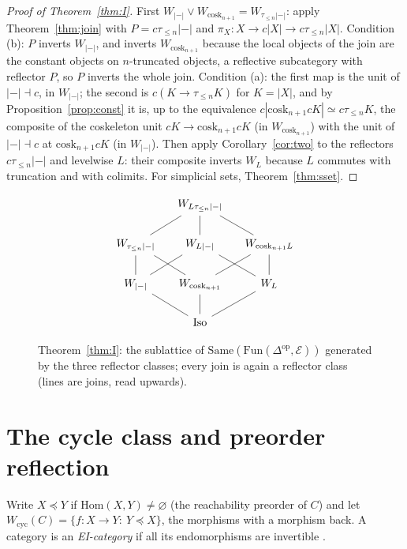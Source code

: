 \documentclass[11pt]{amsart}
\theoremstyle{definition}
\newcommand{\Same}{\mathrm{Same}}
\newcommand{\Iso}{\mathrm{Iso}}
\newcommand{\Hom}{\mathrm{Hom}}
\newcommand{\cosk}{\mathrm{cosk}}
\newcommand{\Fun}{\mathrm{Fun}}
\newcommand{\E}{\mathcal E}
\newcommand{\tr}[1]{\tau_{\le #1}}
\newcommand{\re}{|{-}|}
\newcommand{\Wcyc}{W_{\mathrm{cyc}}}
\begin{document}
\begin{proof}[Proof of Theorem~\ref{thm:I}]
First $W_{\re}\vee W_{\cosk_{n+1}}=W_{\tr n\re}$: apply Theorem~\ref{thm:join}
with $P=c\tr n\re$ and $\pi_X\colon X\to c|X|\to c\tr n|X|$. Condition (b):
$P$ inverts $W_{\re}$, and inverts $W_{\cosk_{n+1}}$ because the local objects
of the join are the constant objects on $n$-truncated objects, a reflective
subcategory with reflector $P$, so $P$ inverts the whole join. Condition (a):
the first map is the unit of $\re\dashv c$, in $W_{\re}$; the second is
$c(K\to\tr nK)$ for $K=|X|$, and by Proposition~\ref{prop:const} it is, up to
the equivalence $c|\cosk_{n+1}cK|\simeq c\tr nK$, the composite of the
coskeleton unit $cK\to\cosk_{n+1}cK$ (in $W_{\cosk_{n+1}}$) with the unit of
$\re\dashv c$ at $\cosk_{n+1}cK$ (in $W_{\re}$). Then apply
Corollary~\ref{cor:two} to the reflectors $c\tr n\re$ and levelwise $L$: their
composite inverts $W_L$ because $L$ commutes with truncation and with colimits.
For simplicial sets, Theorem~\ref{thm:sset}.
\end{proof}

\begin{figure}[ht]
\[
\begin{tikzcd}[row sep=normal, column sep=small]
& & W_{L\tr n\re} & & \\
& W_{\tr n\re}\arrow[ur,dash] & W_{L\re}\arrow[u,dash] & W_{\cosk_{n+1}L}\arrow[ul,dash] & \\
& W_{\re}\arrow[u,dash]\arrow[ur,dash] & W_{\cosk_{n+1}}\arrow[ul,dash]\arrow[ur,dash] & W_{L}\arrow[ul,dash]\arrow[u,dash] & \\
& & \Iso\arrow[ul,dash]\arrow[u,dash]\arrow[ur,dash] & &
\end{tikzcd}
\]
\caption{Theorem~\ref{thm:I}: the sublattice of $\Same(\Fun(\Delta^{\mathrm{op}},\E))$
generated by the three reflector classes; every join is again a reflector
class (lines are joins, read upwards).}\label{fig:cube}
\end{figure}

\section{The cycle class and preorder reflection}\label{sec:order}

Write $X\preceq Y$ if $\Hom(X,Y)\neq\varnothing$ (the reachability preorder of
$C$) and let $\Wcyc(C)=\{f\colon X\to Y:\ Y\preceq X\}$, the morphisms with a
morphism back. A category is an \emph{EI-category} if all its endomorphisms
are invertible \cite{Lueck}.
\end{document}
